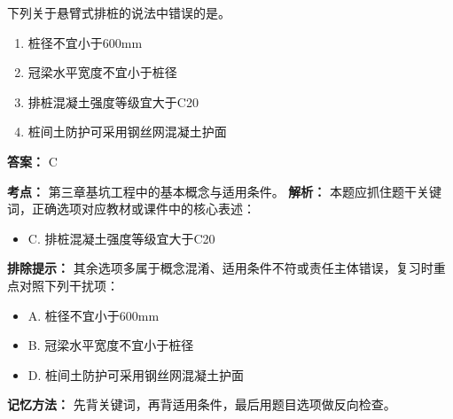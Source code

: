 \documentclass[UTF8,fontset=fandol,11pt]{ctexart}
\begin{document}
\begin{quizbox}[title={第 1 题}]
下列关于悬臂式排桩的说法中错误的是。\\
\begin{enumerate}[label=\Alph*.]
\item 桩径不宜小于600mm
\item 冠梁水平宽度不宜小于桩径
\item 排桩混凝土强度等级宜大于C20
\item 桩间土防护可采用钢丝网混凝土护面
\end{enumerate}
\textbf{答案：} C
\vspace{0.25em}
\begin{answerbox}[title={考点解析}]
\textbf{考点：} 第三章基坑工程中的基本概念与适用条件。
\textbf{解析：} 本题应抓住题干关键词，正确选项对应教材或课件中的核心表述：
\begin{itemize}
\item C. 排桩混凝土强度等级宜大于C20
\end{itemize}
\textbf{排除提示：} 其余选项多属于概念混淆、适用条件不符或责任主体错误，复习时重点对照下列干扰项：
\begin{itemize}
\item A. 桩径不宜小于600mm
\item B. 冠梁水平宽度不宜小于桩径
\item D. 桩间土防护可采用钢丝网混凝土护面
\end{itemize}
\textbf{记忆方法：} 先背关键词，再背适用条件，最后用题目选项做反向检查。
\end{answerbox}
\end{quizbox}
\end{document}
